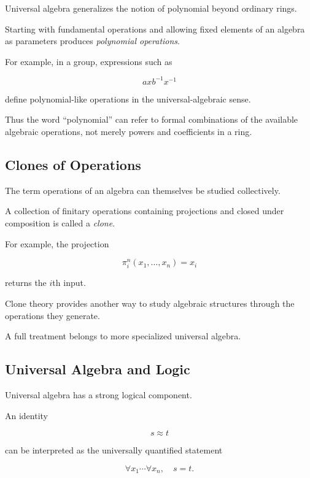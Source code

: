 Universal algebra generalizes the notion of polynomial beyond ordinary
rings.

Starting with fundamental operations and allowing fixed elements of an
algebra as parameters produces \emph{polynomial operations}.

For example, in a group, expressions such as

\[ axb^{-1}x^{-1} \]

define polynomial-like operations in the universal-algebraic sense.

Thus the word ``polynomial'' can refer to formal combinations of the
available algebraic operations, not merely powers and coefficients in a
ring.

\subsection{Clones of Operations}
\label{subsec:clones-preview}

The term operations of an algebra can themselves be studied collectively.

A collection of finitary operations containing projections and closed under
composition is called a \emph{clone}.

For example, the projection

\[ \pi_i^n(x_1,\ldots,x_n)=x_i \]

returns the \(i\)th input.

Clone theory provides another way to study algebraic structures through the
operations they generate.

A full treatment belongs to more specialized universal algebra.

\subsection{Universal Algebra and Logic}
\label{subsec:universal-algebra-logic}

Universal algebra has a strong logical component.

An identity

\[ s\approx t \]

can be interpreted as the universally quantified statement

\[ \forall x_1\cdots\forall x_n,\quad s=t. \]

